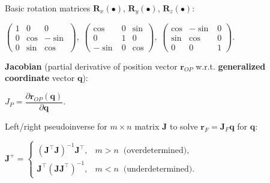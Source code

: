 \documentclass[landscape]{article}
\newcommand{\vmspace}{\vspace{-7pt}}
\newcommand{\vpspace}{\vspace{5pt}}
\begin{document}
\begin{multicols}{3}
\vpspace

\begin{minipage}{\columnwidth}
  Basic rotation matrices $\mathbf R_x(\bullet)$, $\mathbf R_y(\bullet)$, $\mathbf
  R_z(\bullet)$:
  \vmspace
  \begin{center}
    $\left(\begin{matrix}
      1 & 0 & 0 \\
      0 & \cos & -\sin \\
      0 & \sin & \cos
    \end{matrix}\right),\;
    \left(\begin{matrix}
      \cos & 0 & \sin \\
      0 & 1 & 0 \\
      -\sin & 0 & \cos
    \end{matrix}\right),\;
    \left(\begin{matrix}
      \cos & -\sin & 0 \\
      \sin & \cos & 0 \\
      0 & 0 & 1
    \end{matrix}\right).$
  \end{center}
\end{minipage}

\vpspace

\begin{minipage}{\columnwidth}
  \textbf{Jacobian} (partial derivative of position vector $\mathbf{r}_{OP}$
  w.r.t. \textbf{generalized coordinate} vector $\mathbf{q}$):
  \vmspace
  \begin{center}
    $J_P = \dfrac{\partial \mathbf{r}_{OP}(\mathbf q)}{\partial \mathbf q}$.
  \end{center}
\end{minipage}

\vpspace

\begin{minipage}{\columnwidth}
  Left/right pseudoinverse for $m \times n$ matrix $\mathbf{J}$ to solve
  $\mathbf r_F = \mathbf J_F \mathbf q$ for $\mathbf q$:
  \vmspace
  \begin{center}
    $\mathbf{J}^+=
    \begin{cases}
      (\mathbf{J}^\intercal \mathbf J)^{-1} \mathbf J^\intercal, & m>n\;\;
      \text{(overdetermined)},\\
      \mathbf J^\intercal (\mathbf{J} \mathbf J^\intercal)^{-1}, & m<n\;\;
      \text{(underdetermined).}
    \end{cases}$
  \end{center}
\end{minipage}


\end{multicols}
\end{document}
